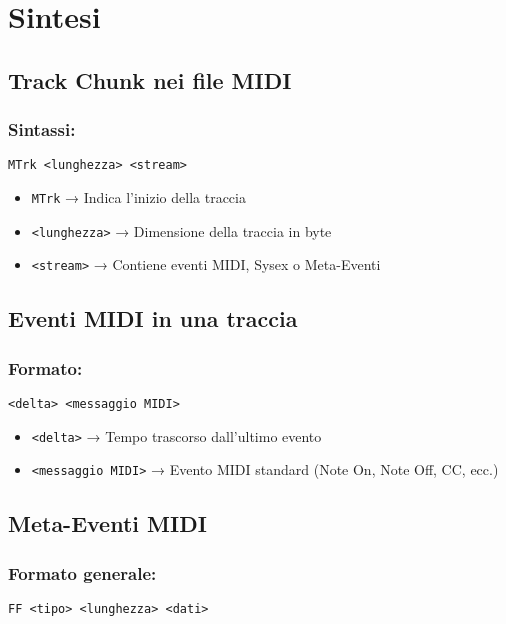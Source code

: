 \chapter{Sintesi}
\section{Track Chunk nei file MIDI}

\subsection*{Sintassi:}
\begin{verbatim}
MTrk <lunghezza> <stream>
\end{verbatim}

\begin{itemize}
    \item \texttt{MTrk} → Indica l'inizio della traccia
    \item \texttt{<lunghezza>} → Dimensione della traccia in byte
    \item \texttt{<stream>} → Contiene eventi MIDI, Sysex o Meta-Eventi
\end{itemize}

\section{Eventi MIDI in una traccia}

\subsection*{Formato:}
\begin{verbatim}
<delta> <messaggio MIDI>
\end{verbatim}

\begin{itemize}
    \item \texttt{<delta>} → Tempo trascorso dall'ultimo evento
    \item \texttt{<messaggio MIDI>} → Evento MIDI standard (Note On, Note Off, CC, ecc.)
\end{itemize}

\section{Meta-Eventi MIDI}

\subsection*{Formato generale:}
\begin{verbatim}
FF <tipo> <lunghezza> <dati>
\end{verbatim}

